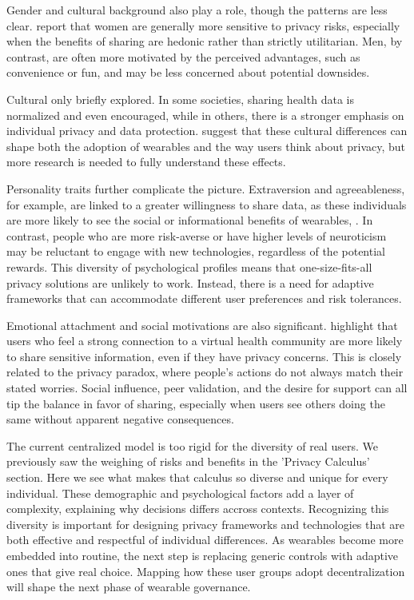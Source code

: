 	Gender and cultural background also play a role, though the patterns are less clear. \cite{Sun2015} report that women are generally more sensitive to privacy risks, especially when the benefits of sharing are hedonic rather than strictly utilitarian. Men, by contrast, are often more motivated by the perceived advantages, such as convenience or fun, and may be less concerned about potential downsides. 

	Cultural only briefly explored. In some societies, sharing health data is normalized and even encouraged, while in others, there is a stronger emphasis on individual privacy and data protection. \cite{Pentina2016} suggest that these cultural differences can shape both the adoption of wearables and the way users think about privacy, but more research is needed to fully understand these effects.

	Personality traits further complicate the picture. Extraversion and agreeableness, for example, are linked to a greater willingness to share data, as these individuals are more likely to see the social or informational benefits of wearables, \cite{Pentina2016}. In contrast, people who are more risk-averse or have higher levels of neuroticism may be reluctant to engage with new technologies, regardless of the potential rewards. This diversity of psychological profiles means that one-size-fits-all privacy solutions are unlikely to work. Instead, there is a need for adaptive frameworks that can accommodate different user preferences and risk tolerances.

	Emotional attachment and social motivations are also significant. \cite{Kordzadeh2016} highlight that users who feel a strong connection to a virtual health community are more likely to share sensitive information, even if they have privacy concerns. This is closely related to the privacy paradox, where people’s actions do not always match their stated worries. Social influence, peer validation, and the desire for support can all tip the balance in favor of sharing, especially when users see others doing the same without apparent negative consequences.

	The current centralized model is too rigid for the diversity of real users. We previously saw the weighing of risks and benefits in the 'Privacy Calculus' section. Here we see what makes that calculus so diverse and unique for every individual. These demographic and psychological factors add a layer of complexity, explaining why decisions differs accross contexts. Recognizing this diversity is important for designing privacy frameworks and technologies that are both effective and respectful of individual differences. As wearables become more embedded into routine, the next step is replacing generic controls with adaptive ones that give real choice. Mapping how these user groups adopt decentralization will shape the next phase of wearable governance.
